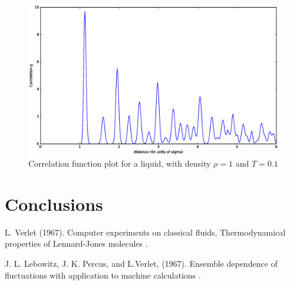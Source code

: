 \documentclass[twoside]{article}
\begin{document}
\begin{figure}
	\centering
	\includegraphics[width=0.7\linewidth]{figure_corr_solid.eps}
	\caption{Correlation function plot for a liquid, with density $\rho = 1$ and $T = 0.1$}
	\label{fig:figure_corr_gas}
\end{figure}

	
	\section{Conclusions}
	\lipsum[4]
	
	
	
	\begin{thebibliography}{1}
		L.   Verlet  (1967). 
		\newblock Computer  experiments   on   classical   fluids, 
		\newblock Thermodynamical properties of Lennard-Jones molecules
		.
		
		J. L. Lebowitz, J. K. Percus, and L.Verlet, (1967).
		\newblock Ensemble dependence of fluctuations with application
		to machine calculations
		.
	\end{thebibliography}
	
\end{document}
